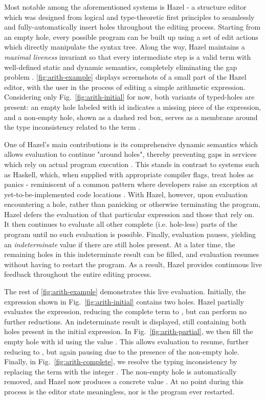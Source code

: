 Most notable among the aforementioned systems is Hazel - a structure editor which was designed from logical and type-theoretic first principles to seamlessly and fully-automatically insert holes throughout the editing process. Starting from an empty hole, every possible program can be built up using a set of edit actions which directly manipulate the syntax tree. Along the way, Hazel maintains a \emph{maximal liveness} invariant so that every intermediate step is a valid term with well-defined static and dynamic semantics, completely eliminating the gap problem \cite{DBLP:journals/pacmpl/OmarVCH19}. \autoref{fig:arith-example} displays screenshots of a small part of the Hazel editor, with the user in the process of editing a simple arithmetic expression. Considering only Fig.~\ref{fig:arith-initial} for now, both variants of typed-holes are present: an empty hole labeled with id  indicates a missing piece of the expression, and a non-empty hole, shown as a dashed red box, serves as a membrane around the type inconsistency related to the term .

One of  Hazel's main contributions is its comprehensive dynamic semantics which allows evaluation to continue "around holes", thereby preventing gaps in services which rely on actual program execution \cite{DBLP:journals/pacmpl/OmarVCH19}. This stands in contrast to systems such as Haskell, which, when supplied with appropriate compiler flags, treat holes as panics - reminiscent of a common pattern where developers raise an exception at yet-to-be-implemented code locations \cite{GHCHoles}. With Hazel, however, upon evaluation encountering a hole, rather than panicking or otherwise terminating the program, Hazel defers the evaluation of that particular expression and those that rely on. It then continues to evaluate all other complete (i.e. hole-less) parts of the program until no such evaluation is possible. Finally, evaluation pauses, yielding an \emph{indeterminate} value if there are still holes present. At a later time, the remaining holes in this indeterminate result can be filled, and evaluation resumes without having to restart the program. As a result, Hazel provides continuous live feedback throughout the entire editing process.

The rest of \autoref{fig:arith-example} demonstrates this live evaluation. Initially, the expression shown in Fig.~\ref{fig:arith-initial} contains two holes. Hazel partially evaluates the expression, reducing the complete term  to , but can perform no further reductions. An indeterminate result is displayed, still containing both holes present in the initial expression. In Fig.~\ref{fig:arith-partial}, we then fill the empty hole with id  using the value . This allows evaluation to resume, further reducing  to , but again pausing due to the presence of the non-empty hole. Finally, in Fig.~\ref{fig:arith-complete}, we resolve the typing inconsistency by replacing the term  with the integer . The non-empty hole is automatically removed, and Hazel now produces a concrete value . At no point during this process is the editor state meaningless, nor is the program ever restarted.

